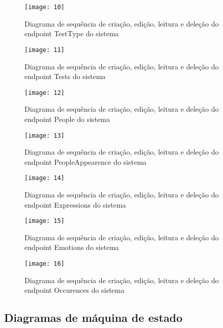 \begin{figure}[h]
  \caption{Diagrama de sequência de criação, edição, leitura e deleção do endpoint TestType do sistema}
  \centering
  \texttt{[image: 10]}
  \label{fig:10}
\end{figure}
\FloatBarrier

\begin{figure}[h]
  \caption{Diagrama de sequência de criação, edição, leitura e deleção do endpoint Tests do sistema}
  \centering
  \texttt{[image: 11]}
  \label{fig:11}
\end{figure}
\FloatBarrier

\begin{figure}[h]
  \caption{Diagrama de sequência de criação, edição, leitura e deleção do endpoint People do sistema}
  \centering
  \texttt{[image: 12]}
  \label{fig:12}
\end{figure}
\FloatBarrier

\begin{figure}[h]
  \caption{Diagrama de sequência de criação, edição, leitura e deleção do endpoint PeopleAppearence do sistema}
  \centering
  \texttt{[image: 13]}
  \label{fig:13}
\end{figure}
\FloatBarrier

\begin{figure}[h]
  \caption{Diagrama de sequência de criação, edição, leitura e deleção do endpoint Expressions do sistema}
  \centering
  \texttt{[image: 14]}
  \label{fig:14}
\end{figure}
\FloatBarrier

\begin{figure}[h]
  \caption{Diagrama de sequência de criação, edição, leitura e deleção do endpoint Emotions do sistema}
  \centering
  \texttt{[image: 15]}
  \label{fig:15}
\end{figure}
\FloatBarrier

\begin{figure}[h]
  \caption{Diagrama de sequência de criação, edição, leitura e deleção do endpoint Occurences do sistema}
  \centering
  \texttt{[image: 16]}
  \label{fig:16}
\end{figure}
\FloatBarrier

\subsection{Diagramas de máquina de estado}

